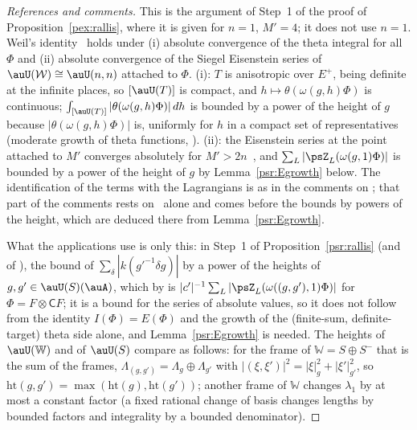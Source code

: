 \documentclass[10pt]{amsart}
\theoremstyle{definition}
\theoremstyle{remark}
\providecommand{\pcW}{\mathbb W}
\begin{document}
\begin{proof}[References and comments]
This is the argument of Step~1 of the proof of Proposition~\ref{pex:rallis}, where it is given for
$n=1$, $M'=4$; it does not use $n=1$. Weil's identity~\cite[Th\'eor\`eme~5]{WeilSiegel} holds under (i) absolute
convergence of the theta integral for all $\Phi$ and (ii) absolute convergence of the Siegel Eisenstein
series of $\auU(\mathcal W)\cong\auU(n,n)$ attached to $\Phi$. (i): $T$ is anisotropic over $E^+$, being
definite at the infinite places, so $[\auU(T)]$ is compact, and $h\mapsto\theta(\omega(g,h)\Phi)$ is
continuous; $\int_{[\auU(T)]}|\theta(\omega(g,h)\Phi)|\,dh$ is bounded by a power of the height of $g$
because $|\theta(\omega(g,h)\Phi)|$ is, uniformly for $h$ in a compact set of representatives (moderate
growth of theta functions, {\cite[Lemma~3.29]{P53}}). (ii): the Eisenstein series at the point attached to $M'$ converges
absolutely for $M'>2n$~\cite[Th\'eor\`eme~1]{WeilSiegel}, and $\sum_L|\psZ_L(\omega(g,1)\Phi)|$ is bounded by a
power of the height of $g$ by Lemma~\ref{psr:Egrowth} below. The identification of the terms
with the Lagrangians is as in the comments on {\cite[Lemma~2.13]{P53}}; that part of the comments rests on~\cite{WeilSiegel} alone and comes before the bounds by powers of the height, which are deduced there from Lemma~\ref{psr:Egrowth}.

What the applications use is only this: in Step~1 of Proposition~\ref{psr:rallis} (and of
{\cite[Proposition~2.16]{P53}}), the bound of $\sum_\delta|k(g'^{-1}\delta g)|$ by a power of the heights of
$g,g'\in\auU(S)(\auA)$, which by {\cite[Lemma~2.14]{P53}} is $|c'|^{-1}\sum_L|\psZ_L(\omega((g,g'),1)\Phi)|$ for
$\Phi=F\otimes\mathsf CF$; it is a bound for the series of absolute values, so it does not follow from the
identity $I(\Phi)=E(\Phi)$ and the growth of the (finite-sum, definite-target) theta side alone, and
Lemma~\ref{psr:Egrowth} is needed. The heights of $\auU(\pcW)$ and of $\auU(S)$ compare as follows: for the frame
of $\pcW=S\oplus S^-$ that is the sum of the frames, $\Lambda_{(g,g')}=\Lambda_g\oplus\Lambda_{g'}$ with
$|(\xi,\xi')|^2=|\xi|_g^2+|\xi'|_{g'}^2$, so $\mathrm{ht}(g,g')=\max(\mathrm{ht}(g),\mathrm{ht}(g'))$; another frame
of $\pcW$ changes $\lambda_1$ by at most a constant factor (a fixed rational change of basis changes lengths
by bounded factors and integrality by a bounded denominator).
\end{proof}
\end{document}
